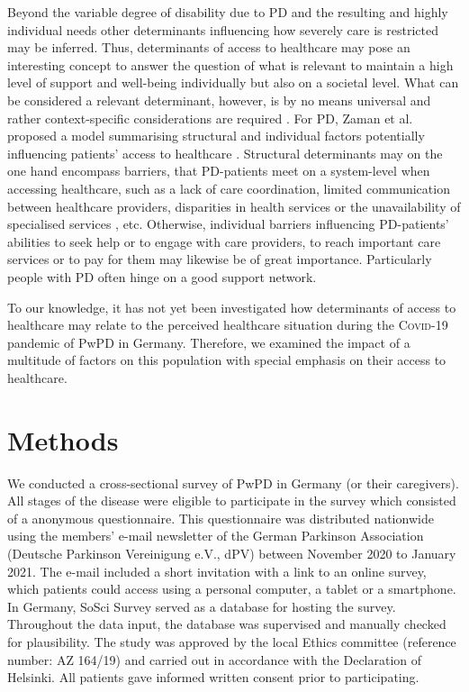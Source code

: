 \documentclass[a4paper,oneside,11pt,english]{scrartcl}
\begin{document}
Beyond the variable degree of disability due to \textsc{PD} and the resulting and highly individual needs other determinants influencing how severely care is restricted may be inferred. Thus, determinants of access to healthcare may pose an interesting concept to answer the question of what is relevant to maintain a high level of support and well-being individually but also on a societal level. What can be considered a relevant determinant, however, is by no means universal and rather context-specific considerations are required \cite{world2010conceptual}. For \textsc{PD}, Zaman et al. proposed a model summarising structural and individual factors potentially influencing patients' access to healthcare \cite{zaman2021barriers}. Structural determinants may on the one hand encompass barriers, that \textsc{PD}-patients meet on a system-level when accessing healthcare, such as a lack of care coordination, limited communication between healthcare providers, disparities in health services or the unavailability of specialised services \cite{zaman2021barriers}, etc. Otherwise, individual barriers influencing \textsc{PD}-patients' abilities to seek help or to engage with care providers, to reach important care services or to pay for them \cite{zaman2021barriers} may likewise be of great importance. Particularly people with \textsc{PD} often hinge on a good support network. 

To our knowledge, it has not yet been investigated how determinants of access to healthcare may relate to the perceived healthcare situation during the \textsc{Covid}-19 pandemic of Pw\textsc{PD} in Germany. Therefore, we examined the impact of a multitude of factors on this population with special emphasis on their access to healthcare.

\newpage

\section*{Methods}
We conducted a cross-sectional survey of Pw\textsc{PD} in Germany (or their caregivers). All stages of the disease were eligible to participate in the survey which consisted of a anonymous questionnaire. This questionnaire was distributed nationwide using the members' e-mail newsletter of the German Parkinson Association (Deutsche Parkinson Vereinigung e.V., dPV) between November 2020 to January 2021. The e-mail included a short invitation with a link to an online survey, which patients could access using a personal computer, a tablet or a smartphone. In Germany, SoSci Survey \cite{leiner2019sosci} served as a database for hosting the survey. Throughout the data input, the database was supervised and manually checked for plausibility. The study was approved by the local Ethics committee (reference number: AZ 164/19) and carried out in accordance with the Declaration of Helsinki. All patients gave informed written consent prior to participating.
\end{document}
